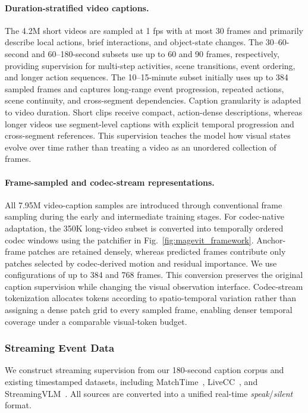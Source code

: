 \paragraph{Duration-stratified video captions.}
The 4.2M short videos are sampled at 1 fps with at most 30 frames and primarily describe local actions, brief interactions, and object-state changes. The 30--60-second and 60--180-second subsets use up to 60 and 90 frames, respectively, providing supervision for multi-step activities, scene transitions, event ordering, and longer action sequences. The 10--15-minute subset initially uses up to 384 sampled frames and captures long-range event progression, repeated actions, scene continuity, and cross-segment dependencies.
Caption granularity is adapted to video duration. Short clips receive compact, action-dense descriptions, whereas longer videos use segment-level captions with explicit temporal progression and cross-segment references. This supervision teaches the model how visual states evolve over time rather than treating a video as an unordered collection of frames.

\paragraph{Frame-sampled and codec-stream representations.}
All 7.95M video-caption samples are introduced through conventional frame sampling during the early and intermediate training stages. For codec-native adaptation, the 350K long-video subset is converted into temporally ordered codec windows using the patchifier in Fig.~\ref{fig:magevit_framework}. Anchor-frame patches are retained densely, whereas predicted frames contribute only patches selected by codec-derived motion and residual importance. We use configurations of up to 384 and 768 frames.
This conversion preserves the original caption supervision while changing the visual observation interface. Codec-stream tokenization allocates tokens according to spatio-temporal variation rather than assigning a dense patch grid to every sampled frame, enabling denser temporal coverage under a comparable visual-token budget.

\subsubsection{Streaming Event Data}
\label{sec:streaming_event_data}

We construct streaming supervision from our 180-second caption corpus and existing timestamped datasets, including MatchTime~\citep{rao2024matchtimeautomaticsoccergame}, LiveCC~\citep{chen2025livecclearningvideollm}, and StreamingVLM~\citep{xu2026streamingvlmrealtimeunderstandinginfinite}. All sources are converted into a unified real-time \emph{speak}/\emph{silent} format.


